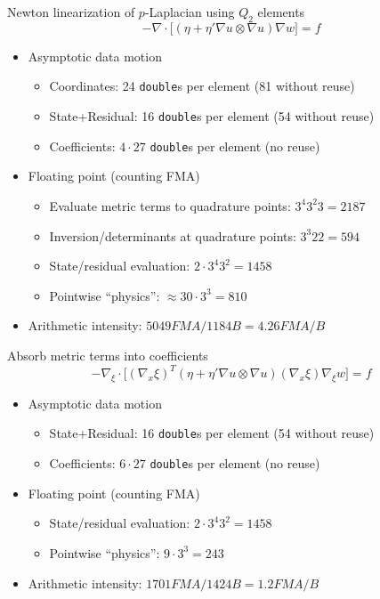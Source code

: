 \documentclass{beamer}
\begin{document}
\begin{frame}{Newton linearization of $p$-Laplacian using $Q_2$ elements}
  \begin{equation*}
    -\nabla\cdot \Big[ (\eta + \eta' \nabla u \otimes \nabla u) \nabla w \Big] = f
  \end{equation*}
  \begin{itemize}
  \item Asymptotic data motion
    \begin{itemize}
    \item Coordinates: 24 \texttt{double}s per element (81 without reuse)
    \item State+Residual: 16 \texttt{double}s per element (54 without reuse)
    \item Coefficients: $4\cdot 27$ \texttt{double}s per element (no reuse)
    \end{itemize}
  \item Floating point (counting FMA)
    \begin{itemize}
    \item Evaluate metric terms to quadrature points: $3^4 3^2 3 = 2187$
    \item Inversion/determinants at quadrature points: $3^3 22 = 594$
    \item State/residual evaluation: $2 \cdot 3^4 3^2 = 1458$
    \item Pointwise ``physics'': $\approx 30 \cdot 3^3 = 810$
    \end{itemize}
  \item Arithmetic intensity: $5049 FMA/1184 B = 4.26 FMA/B$
  \end{itemize}
\end{frame}

\begin{frame}{Absorb metric terms into coefficients}
  \begin{equation*}
    -\nabla_\xi\cdot \Big[ (\nabla_x\xi)^T(\eta + \eta' \nabla u \otimes \nabla u)(\nabla_x\xi) \nabla_\xi w \Big] = f
  \end{equation*}
  \begin{itemize}
  \item Asymptotic data motion
    \begin{itemize}
    \item State+Residual: 16 \texttt{double}s per element (54 without reuse)
    \item Coefficients: $6\cdot 27$ \texttt{double}s per element (no reuse)
    \end{itemize}
  \item Floating point (counting FMA)
    \begin{itemize}
    \item State/residual evaluation: $2 \cdot 3^4 3^2 = 1458$
    \item Pointwise ``physics'': $9 \cdot 3^3 = 243$
    \end{itemize}
  \item Arithmetic intensity: $1701 FMA/1424 B = 1.2 FMA/B$
  \end{itemize}
\end{frame}
\end{document}
